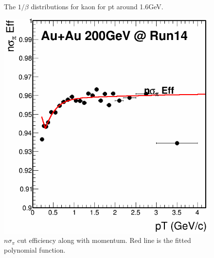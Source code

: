 \begin{figure}[htbp]
\begin{minipage}[htbp]{0.5\linewidth}
\caption{The $1/\beta$ distributions for kaon for pt around 1.6GeV. \label{fig:kaon_1beta2}}
\end{minipage}
\end{figure}


\begin{figure}[htbp]
\begin{minipage}[htbp]{0.5\linewidth}
\centering
\includegraphics[width=1.0\textwidth]{figure/Run14_D0HFT/nSigPion_Eff.png}
\caption{$n\sigma_{\pi}$ cut efficiency along with momentum. Red line is the fitted polynomial function.\label{fig:pionnsigmaeff}}
\end{minipage}
\hfill
\begin{minipage}[htbp]{0.5\linewidth}
\centering

\end{minipage}
\end{figure}
